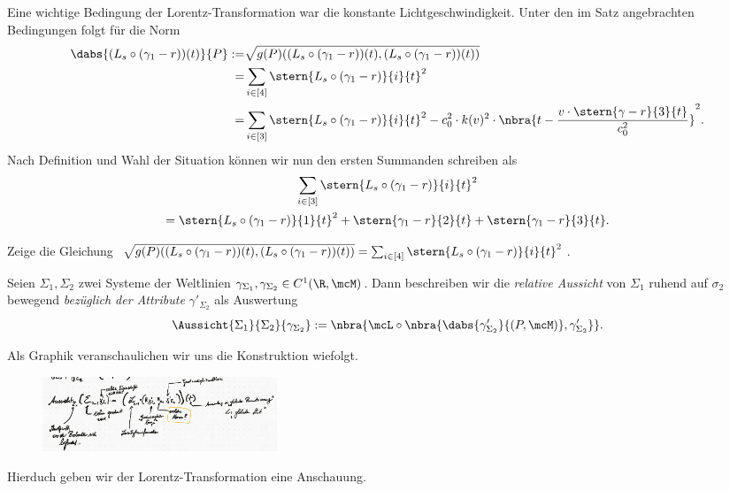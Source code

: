 \documentclass[../WiSe22ANA3.tex]{subfiles}
\begin{document}
			Eine wichtige Bedingung der Lorentz-Transformation war die konstante Lichtgeschwindigkeit. Unter den im Satz angebrachten Bedingungen folgt für die Norm
			\begin{align*}
				\dabs{(L_s\circ (\gamma_1-r))(t)}{P}:=&\sqrt{g(P)((L_s\circ (\gamma_1-r))(t),(L_s\circ (\gamma_1-r))(t))} \\
				=&\sum_{i\in[4]}\stern{L_s\circ (\gamma_1-r)}{i}{t}^2 \\
				=&\sum_{i\in[3]}\stern{L_s\circ (\gamma_1-r)}{i}{t}^2-c_0^2\cdot k(v)^2\cdot\nbra{t-\frac{v\cdot\stern{\gamma-r}{3}{t}}{c_0^2}}^2.
			\end{align*}
			Nach Definition und Wahl der Situation können wir nun den ersten Summanden schreiben als
			\begin{multline*}
				\sum_{i\in[3]}\stern{L_s\circ (\gamma_1-r)}{i}{t}^2 \\
				=\stern{L_s\circ (\gamma_1-r)}{1}{t}^2+\stern{\gamma_1-r}{2}{t}+\stern{\gamma_1-r}{3}{t}.
			\end{multline*}
			\begin{Aufgabe}
				\nr Zeige die Gleichung $\sqrt{g(P)((L_s\circ (\gamma_1-r))(t),(L_s\circ (\gamma_1-r))(t))}=\sum_{i\in[4]}\stern{L_s\circ (\gamma_1-r)}{i}{t}^2$. 
			\end{Aufgabe}
			
				
			\begin{info}
				Seien $\Sigma_1,\Sigma_2$ zwei Systeme der Weltlinien $\gamma_{\Sigma_1},\gamma_{\Sigma_2}\in C^1(\R,\mcM)$. Dann beschreiben wir die \emph{relative Aussicht} von $\Sigma_1$ ruhend auf $\sigma_2$ bewegend \emph{bezüglich der Attribute} $\gamma'_{\Sigma_2}$ als Auswertung 
				$$\Aussicht{\Sigma_1}{\Sigma_2}{\gamma_{\Sigma_2}}:=\nbra{\mcL\circ\nbra{\dabs{\gamma'_{\Sigma_2}}{(P,\mcM)},\gamma'_{\Sigma_2}}}.$$
			\end{info}
			Als Graphik veranschaulichen wir uns die Konstruktion wiefolgt.
			\begin{figure}[H]
				\centering
				\includegraphics[width=7cm]{Bilddateien/IMG_5C89688377FE-1.jpeg}
			\end{figure}
			Hierduch geben wir der Lorentz-Transformation eine Anschauung. 
			
\end{document}
